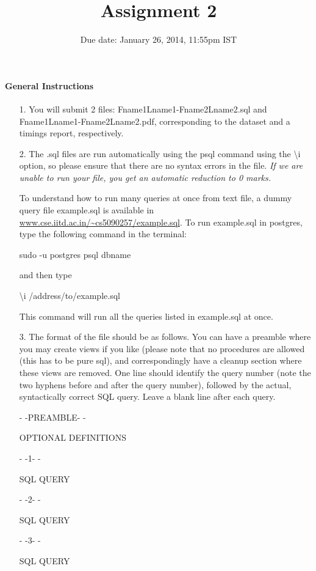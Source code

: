 \documentclass[10pt]{article}
\title{Assignment 2}
\date{Due date: January 26, 2014, 11:55pm IST}
\begin{document}
\maketitle
\paragraph*{General Instructions}


\begin{itemize}

\item[1.]You will submit 2 files: Fname1Lname1-Fname2Lname2.sql and Fname1Lname1-Fname2Lname2.pdf, corresponding to the dataset and a timings report, respectively.

\item[2.]The .sql files are run automatically using the psql command using the \textbackslash i option, so please ensure that there are no syntax errors in the file. {\it If we are unable to run your file, you get an automatic reduction to 0 marks.}


To understand how to run many queries at once from text file, a dummy query file example.sql is available in 
\url{www.cse.iitd.ac.in/~cs5090257/example.sql}. To run example.sql in postgres, type the following command in the terminal:

sudo -u postgres psql dbname

and then type 

\textbackslash i /address/to/example.sql

This command will run all the queries listed in example.sql at once.  

\item[3.]The format of the file should be as follows. You can have a preamble where you may create views if you like (please note that no procedures are allowed (this has to be pure sql), and correspondingly have a cleanup section where these views are removed. One line should identify the query number (note the two hyphens before and after the query number), followed by the actual, syntactically correct SQL
query. Leave a blank line after each query. 

- -PREAMBLE- -

OPTIONAL DEFINITIONS

- -1- -

SQL QUERY

- -2- -

SQL QUERY

- -3- -

SQL QUERY


\end{itemize}
\end{document}
